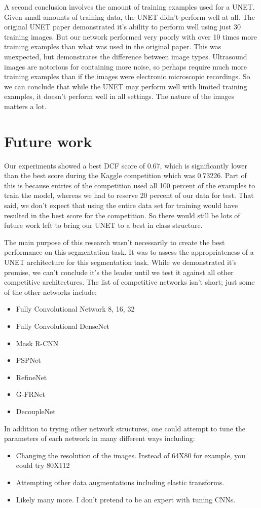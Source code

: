 \documentclass[letterpaper]{article}
\begin{document}
A second conclusion involves the amount of training examples used for a UNET. Given small amounts of training data, the UNET didn't perform well at all. The original UNET paper demonstrated it's ability to perform well using just 30 training images. But our network performed very poorly with over 10 times more training examples than what was used in the original paper. This was unexpected, but demonstrates the difference between image types. Ultrasound images are notorious for containing more noise, so perhaps require much more training examples than if the images were electronic microscopic recordings. So we can conclude that while the UNET may perform well with limited training examples, it doesn't perform well in all settings. The nature of the images matters a lot.

\section{Future work}
Our experiments showed a best DCF score of 0.67, which is significantly lower than the best score during the Kaggle competition which was 0.73226. Part of this is because entries of the competition used all 100 percent of the examples to train the model, whereas we had to reserve 20 percent of our data for test. That said, we don't expect that using the entire data set for training would have resulted in the best score for the competition. So there would still be lots of future work left to bring our UNET to a best in class structure. 

The main purpose of this research wasn't necessarily to create the best performance on this segmentation task. It was to assess the appropriateness of a UNET architecture for this segmentation task. While we demonstrated it's promise, we can't conclude it's the leader until we test it against all other competitive architectures. The list of competitive networks isn't short; just some of the other networks include:
\begin{itemize}
  \item Fully Convolutional Network 8, 16, 32
  \item Fully Convolutional DenseNet
  \item Mask R-CNN
  \item PSPNet
  \item RefineNet
  \item G-FRNet
  \item DecoupleNet
  
  
\end{itemize}

In addition to trying other network structures, one could attempt to tune the parameters of each network in many different ways including:
\begin{itemize}
  \item Changing the resolution of the images. Instead of 64X80 for example, you could try 80X112
  \item Attempting other data augmentations including elastic transforms. 
  \item Likely many more. I don't pretend to be an expert with tuning CNNs.
  
\end{itemize}


\end{document}
